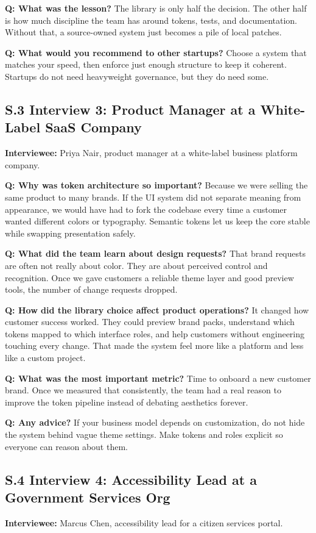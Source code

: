 \textbf{Q: What was the lesson?}
The library is only half the decision. The other half is how much discipline the team has around tokens, tests, and documentation. Without that, a source-owned system just becomes a pile of local patches.

\textbf{Q: What would you recommend to other startups?}
Choose a system that matches your speed, then enforce just enough structure to keep it coherent. Startups do not need heavyweight governance, but they do need some.

\subsection*{S.3 Interview 3: Product Manager at a White-Label SaaS Company}
\textbf{Interviewee:} Priya Nair, product manager at a white-label business platform company.

\textbf{Q: Why was token architecture so important?}
Because we were selling the same product to many brands. If the UI system did not separate meaning from appearance, we would have had to fork the codebase every time a customer wanted different colors or typography. Semantic tokens let us keep the core stable while swapping presentation safely.

\textbf{Q: What did the team learn about design requests?}
That brand requests are often not really about color. They are about perceived control and recognition. Once we gave customers a reliable theme layer and good preview tools, the number of change requests dropped.

\textbf{Q: How did the library choice affect product operations?}
It changed how customer success worked. They could preview brand packs, understand which tokens mapped to which interface roles, and help customers without engineering touching every change. That made the system feel more like a platform and less like a custom project.

\textbf{Q: What was the most important metric?}
Time to onboard a new customer brand. Once we measured that consistently, the team had a real reason to improve the token pipeline instead of debating aesthetics forever.

\textbf{Q: Any advice?}
If your business model depends on customization, do not hide the system behind vague theme settings. Make tokens and roles explicit so everyone can reason about them.

\subsection*{S.4 Interview 4: Accessibility Lead at a Government Services Org}
\textbf{Interviewee:} Marcus Chen, accessibility lead for a citizen services portal.

